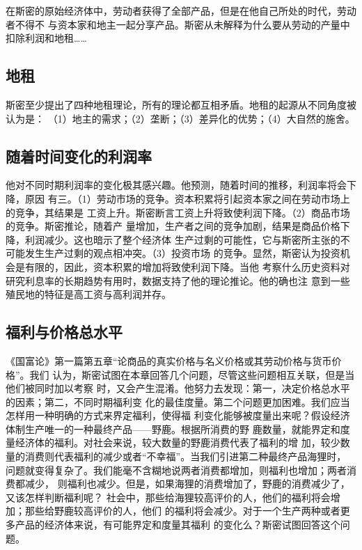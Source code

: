 在斯密的原始经济体中，劳动者获得了全部产品，但是在他自己所处的时代，劳动者不得不
与资本家和地主一起分享产品。斯密从未解释为什么要从劳动的产量中扣除利润和地租……

\subsection{地租}

斯密至少提出了四种地租理论，所有的理论都互相矛盾。地租的起源从不同角度被认为是：
（1）地主的需求；（2）垄断；（3）差异化的优势；（4）大自然的施舍。

\subsection{随着时间变化的利润率}

他对不同时期利润率的变化极其感兴趣。他预测，随着时间的推移，利润率将会下降，原因
有三。（1）劳动市场的竞争。资本积累将引起资本家之间在劳动市场上的竞争，其结果是
工资上升。斯密断言工资上升将致使利润下降。（2）商品市场的竞争。斯密推论，随着产
量增加，生产者之间的竞争加剧，结果是商品价格下降，利润减少。这也暗示了整个经济体
生产过剩的可能性，它与斯密所主张的不可能发生生产过剩的观点相冲突。（3）投资市场
的竞争。显然，斯密认为投资机会是有限的，因此，资本积累的增加将致使利润下降。当他
考察什么历史资料对研究利息率的长期趋势有用时，数据支持了他的理论推论。他的确也注
意到一些殖民地的特征是高工资与高利润并存。


\subsection{福利与价格总水平}

《国富论》第一篇第五章“论商品的真实价格与名义价格或其劳动价格与货币价格”。我们
认为，斯密试图在本章回答几个问题，尽管这些问题相互关联，但是当他们被同时加以考察
时，又会产生混淆。他努力去发现：第一，决定价格总水平的因素；第二，不同时期福利变
化的最佳度量。第二个问题更加困难。我们应当怎样用一种明确的方式来界定福利，使得福
利变化能够被度量出来呢？假设经济体制生产唯一的一种最终产品——野鹿。根据所消费的野
鹿数量，就能界定和度量经济体的福利。对社会来说，较大数量的野鹿消费代表了福利的增
加，较少数量的消费则代表福利的减少或者“不幸福”。当我们引进第二种最终产品海狸时，
问题就变得复杂了。我们能毫不含糊地说两者消费都增加，则福利也增加；两者消费都减少，
则福利也减少。但是，如果海狸的消费增加了，野鹿的消费减少了，又该怎样判断福利呢？
社会中，那些给海狸较高评价的人，他们的福利将会增加；那些给野鹿较高评价的人，他们
的福利将会减少。对于一个生产两种或者更多产品的经济体来说，有可能界定和度量其福利
的变化么？斯密试图回答这个问题。

